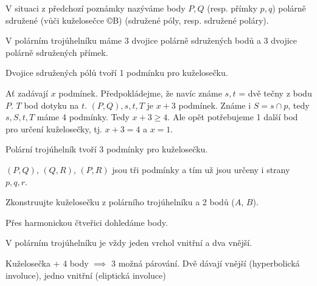 \documentclass[12pt]{article}					%
\begin{document}
\begin{definice}
	V situaci z předchozí poznámky nazýváme body $P, Q$ (resp. přímky $p, q$) polárně sdružené (vůči kuželosečce ©B) (sdružené póly, resp. sdružené poláry).

	\begin{poznamkain}
		V polárním trojúhelníku máme 3 dvojice polárně sdružených bodů a 3 dvojice polárně sdružených přímek.
	\end{poznamkain}
\end{definice}

\begin{veta}
	Dvojice sdružených pólů tvoří 1 podmínku pro kuželosečku.

	\begin{dukazin}
		Ať zadávají $x$ podmínek. Předpokládejme, že navíc známe $s, t$ = dvě tečny z bodu $P$. $T$ bod dotyku na $t$. $(P, Q), s, t, T$ je $x + 3$ podmínek. Známe i $S = s \cap p$, tedy $s, S, t, T$ máme 4 podmínky. Tedy $x + 3 ≥ 4$. Ale opět potřebujeme 1 další bod pro určení kuželosečky, tj. $x + 3 = 4$ a $x = 1$.
	\end{dukazin}
\end{veta}

\begin{veta}
	Polární trojúhelník tvoří 3 podmínky pro kuželosečku.

	\begin{dukazin}
		$(P, Q)$, $(Q, R)$, $(P, R)$ jsou tři podmínky a tím už jsou určeny i strany $p, q, r$.
	\end{dukazin}
\end{veta}

\begin{priklad}[Konstrukce]
	Zkonstruujte kuželosečku z polárního trojúhelníku a 2 bodů ($A$, $B$).

	\begin{reseni}
		Přes harmonickou čtveřici dohledáme body.
	\end{reseni}
\end{priklad}

\begin{poznamka}
	V polárním trojúhelníku je vždy jeden vrchol vnitřní a dva vnější.


	\begin{dukazin}
		Kuželosečka + 4 body $\implies$ 3 možná párování. Dvě dávají vnější (hyperbolická involuce), jedno vnitřní (eliptická involuce)
	\end{dukazin}
\end{poznamka}
\end{document}
